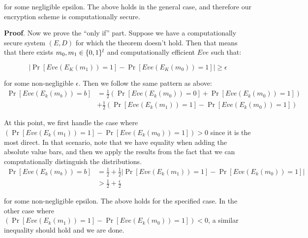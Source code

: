 \documentclass{article}
\begin{document}
\begin{enumerate}[,start=6]
for some negligible epsilon. The above holds in the general case, and therefore our encryption scheme is computationally secure. 
\mdfloatright{\ensuremath{\Box}}%

\begin{mdbmarginx}{1ex}{0pt}{1ex}{0pt}%
\noindent{}\textbf{Proof}.  Now we prove the \textquotedblleft{}only if\textquotedblright{} part. Suppose we have a computationally secure system $(E,D)$ for which
the theorem doesn't hold. Then that means that there exists $m_0,m_1 \in \{0,1\}^l$ and computationally 
efficient $Eve$ such that:%
\end{mdbmarginx}%
\noindent\noindent\[%
|\Pr[Eve(E_K(m_1)) = 1] - \Pr[Eve(E_K(m_0)) = 1]| \geq \epsilon
\]%

for some non-negligible $\epsilon$. Then we follow the same pattern as above:%
\noindent\noindent\[%
\begin{aligned}
\Pr[Eve(E_k(m_b)) = b] &= \frac{1}{2} (\Pr[Eve(E_k(m_0)) = 0] + \Pr[Eve(E_k(m_0)) = 1]) \\
&+\frac{1}{2}(\Pr[Eve(E_k(m_1)) = 1] - \Pr[Eve(E_k(m_0)) = 1])
\end{aligned}
\]%

At this point, we first handle the case where $(\Pr[Eve(E_k(m_1)) = 1] - \Pr[Eve(E_k(m_0)) = 1]) > 0$ since 
it is the most direct. In that scenario, note that we have equality when adding the absolute value bars,
and then we apply the results from the fact that we can computationally distinguish the distributions.%
\noindent\noindent\[%
\begin{aligned}
\Pr[Eve(E_k(m_b)) = b] &= \frac{1}{2} + \frac{1}{2}|\Pr[Eve(E_k(m_1)) = 1] - \Pr[Eve(E_k(m_0)) = 1]| \\
&> \frac{1}{2} + \frac{\epsilon}{2} 
\end{aligned}
\]%

for some non-negligible epsilon. The above holds for the specified case. In the other case where 
$(\Pr[Eve(E_k(m_1)) = 1] - \Pr[Eve(E_k(m_0)) = 1]) < 0$, a similar inequality should hold and we are done.
\mdfloatright{\ensuremath{\Box}}%


\end{enumerate}
\end{document}
